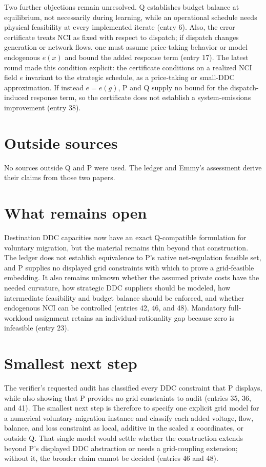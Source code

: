 \documentclass{article}
\begin{document}
Two further objections remain unresolved. Q establishes budget balance at equilibrium, not necessarily during learning, while an operational schedule needs physical feasibility at every implemented iterate (entry 6). Also, the error certificate treats NCI as fixed with respect to dispatch; if dispatch changes generation or network flows, one must assume price-taking behavior or model endogenous $e(x)$ and bound the added response term (entry 17). The latest round made this condition explicit: the certificate conditions on a realized NCI field $e$ invariant to the strategic schedule, as a price-taking or small-DDC approximation. If instead $e=e(g)$, P and Q supply no bound for the dispatch-induced response term, so the certificate does not establish a system-emissions improvement (entry 38).

\section*{Outside sources}
No sources outside Q and P were used. The ledger and Emmy's assessment derive their claims from those two papers.

\section*{What remains open}
Destination DDC capacities now have an exact Q-compatible formulation for voluntary migration, but the material remains thin beyond that construction. The ledger does not establish equivalence to P's native net-regulation feasible set, and P supplies no displayed grid constraints with which to prove a grid-feasible embedding. It also remains unknown whether the assumed private costs have the needed curvature, how strategic DDC suppliers should be modeled, how intermediate feasibility and budget balance should be enforced, and whether endogenous NCI can be controlled (entries 42, 46, and 48). Mandatory full-workload assignment retains an individual-rationality gap because zero is infeasible (entry 23).

\section*{Smallest next step}
The verifier's requested audit has classified every DDC constraint that P displays, while also showing that P provides no grid constraints to audit (entries 35, 36, and 41). The smallest next step is therefore to specify one explicit grid model for a numerical voluntary-migration instance and classify each added voltage, flow, balance, and loss constraint as local, additive in the scaled $x$ coordinates, or outside Q. That single model would settle whether the construction extends beyond P's displayed DDC abstraction or needs a grid-coupling extension; without it, the broader claim cannot be decided (entries 46 and 48).
\end{document}
